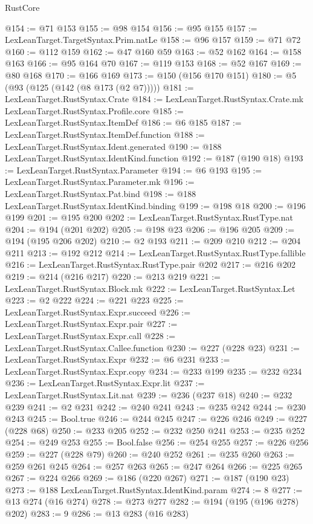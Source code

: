 \begin{lexlean}{RustCore}
\begin{coremodule}
{\begin{coremodule}
{{{{{{{{@154 := @71 @153
@155 := @98 @154
@156 := @95 @155
@157 := LexLeanTarget.TargetSyntax.Prim.natLe
@158 := @96 @157
@159 := @71 @72
@160 := @112 @159
@162 := @47 @160 @59
@163 := @52 @162
@164 := @158 @163
@166 := @95 @164 @70
@167 := @119 @153
@168 := @52 @167
@169 := @80 @168
@170 := @166 @169
@173 := @150 (@156 @170 @151)
@180 := @5 (@93 (@125 (@142 (@8 @173 (@2 @7)))))
@181 := LexLeanTarget.RustSyntax.Crate
@184 := LexLeanTarget.RustSyntax.Crate.mk LexLeanTarget.RustSyntax.Profile.core
@185 := LexLeanTarget.RustSyntax.ItemDef
@186 := @6 @185
@187 := LexLeanTarget.RustSyntax.ItemDef.function
@188 := LexLeanTarget.RustSyntax.Ident.generated
@190 := @188 LexLeanTarget.RustSyntax.IdentKind.function
@192 := @187 (@190 @18)
@193 := LexLeanTarget.RustSyntax.Parameter
@194 := @6 @193
@195 := LexLeanTarget.RustSyntax.Parameter.mk
@196 := LexLeanTarget.RustSyntax.Pat.bind
@198 := @188 LexLeanTarget.RustSyntax.IdentKind.binding
@199 := @198 @18
@200 := @196 @199
@201 := @195 @200
@202 := LexLeanTarget.RustSyntax.RustType.nat
@204 := @194 (@201 @202)
@205 := @198 @23
@206 := @196 @205
@209 := @194 (@195 @206 @202)
@210 := @2 @193
@211 := @209 @210
@212 := @204 @211
@213 := @192 @212
@214 := LexLeanTarget.RustSyntax.RustType.fallible
@216 := LexLeanTarget.RustSyntax.RustType.pair @202
@217 := @216 @202
@219 := @214 (@216 @217)
@220 := @213 @219
@221 := LexLeanTarget.RustSyntax.Block.mk
@222 := LexLeanTarget.RustSyntax.Let
@223 := @2 @222
@224 := @221 @223
@225 := LexLeanTarget.RustSyntax.Expr.succeed
@226 := LexLeanTarget.RustSyntax.Expr.pair
@227 := LexLeanTarget.RustSyntax.Expr.call
@228 := LexLeanTarget.RustSyntax.Callee.function
@230 := @227 (@228 @23)
@231 := LexLeanTarget.RustSyntax.Expr
@232 := @6 @231
@233 := LexLeanTarget.RustSyntax.Expr.copy
@234 := @233 @199
@235 := @232 @234
@236 := LexLeanTarget.RustSyntax.Expr.lit
@237 := LexLeanTarget.RustSyntax.Lit.nat
@239 := @236 (@237 @18)
@240 := @232 @239
@241 := @2 @231
@242 := @240 @241
@243 := @235 @242
@244 := @230 @243
@245 := Bool.true
@246 := @244 @245
@247 := @226 @246
@249 := @227 (@228 @68)
@250 := @233 @205
@252 := @232 @250 @241
@253 := @235 @252
@254 := @249 @253
@255 := Bool.false
@256 := @254 @255
@257 := @226 @256
@259 := @227 (@228 @79)
@260 := @240 @252
@261 := @235 @260
@263 := @259 @261 @245
@264 := @257 @263
@265 := @247 @264
@266 := @225 @265
@267 := @224 @266
@269 := @186 (@220 @267)
@271 := @187 (@190 @23)
@273 := @188 LexLeanTarget.RustSyntax.IdentKind.param
@274 := 8
@277 := @13 @274 (@16 @274)
@278 := @273 @277
@282 := @194 (@195 (@196 @278) @202)
@283 := 9
@286 := @13 @283 (@16 @283)
}}}}}}}}
\end{coremodule}}
\end{coremodule}
\end{lexlean}

